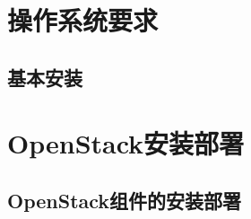 \documentclass[a4paper,12pt,oneside]{report}
\begin{document}


\part{操作系统要求}

\chapter{基本安装}





\part{OpenStack安装部署}
\chapter{OpenStack组件的安装部署}

\end{document}
